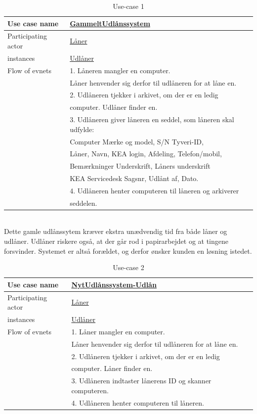 \documentclass[a4paper]{article}
\begin{document}
\begin{table}[h]
\caption{Use-case 1}
\begin{tabular}{ll}
Use case name               & \underline{GammeltUdlånssystem} \\ \hline
Participating actor           & \underline{Låner} \\
instances                     & \underline{Udlåner} \\ \hline
Flow of evnets                & 1. Låneren mangler en computer.\\& Låner henvender sig derfor til udlåneren for at låne en.
\\& 2. Udlåneren tjekker i arkivet, om der er en ledig \\& computer. Udlåner finder en.
\\& 3. Udlåneren giver låneren en seddel, som låneren skal udfylde: \\& Computer Mærke og model, S/N Tyveri-ID, \\& Låner, Navn, KEA login, Afdeling, Telefon/mobil, \\& Bemærkninger Underskrift, Låners underskrift \\& KEA Servicedesk Sagsnr, Udlånt af, Dato.
\\& 4. Udlåneren henter computeren til låneren og arkiverer
\\& seddelen.
\end{tabular}
\end{table} \\
Dette gamle udlånssytem kræver ekstra unædvendig tid fra både låner og udlåner. Udlåner riskere også, at der går rod i papirarbejdet og at tingene forsvinder. Systemet er altså forældet, og derfor ønsker kunden en løsning istedet. \\
\begin{table}[h]
\caption{Use-case 2}
\begin{tabular}{ll}
Use case name             & \underline{NytUdlånssystem-Udlån} \\ \hline
Participating actor           & \underline{Låner} \\
instances                     & \underline{Udlåner}\\ \hline
Flow of evnets                & 1. Låner mangler en computer.	\\& Låner henvender sig derfor til udlåneren for at låne en.
\\& 2. Udlåneren tjekker i arkivet, om der er en ledig \\& computer. Låner finder en.
\\& 3. Udlåneren indtaster lånerens ID og skanner computeren.
\\& 4. Udlåneren henter computeren til låneren.
\end{tabular}
\end{table}\\
\end{document}
